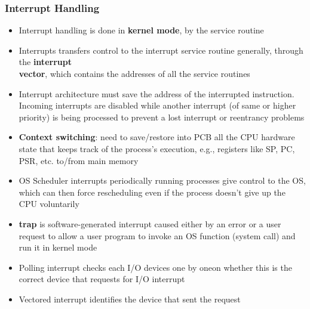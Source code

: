 \documentclass[a4paper]{article}
\begin{document}
\subsubsection{Interrupt Handling}
\begin{itemize}
	\item Interrupt handling is done in \textbf{kernel mode}, by the service routine
	\item Interrupts transfers control to the interrupt service routine generally, through the \textbf{interrupt \\ vector}, which contains the addresses of all the service routines
	\item Interrupt architecture must save the address of the interrupted instruction. Incoming interrupts are disabled while another interrupt (of same or higher priority) is being processed to prevent a lost interrupt or reentrancy problems
	\item \textbf{Context switching}: need to save/restore into PCB all the CPU hardware state that keeps track of the process’s execution, e.g., registers like SP, PC, PSR, etc. to/from main memory
	\item OS Scheduler interrupts periodically running processes give control to the OS, which can then force rescheduling even if the process doesn’t give up the CPU voluntarily
	\item \textbf{trap} is software-generated interrupt caused either by an error or a user request to allow a user program to invoke an OS function (system call) and run it in kernel mode
	\item Polling interrupt checks each I/O devices one by oneon whether this is the correct device that requests for I/O interrupt
	\item Vectored interrupt identifies the device that sent the request
\end{itemize}
\end{document}
